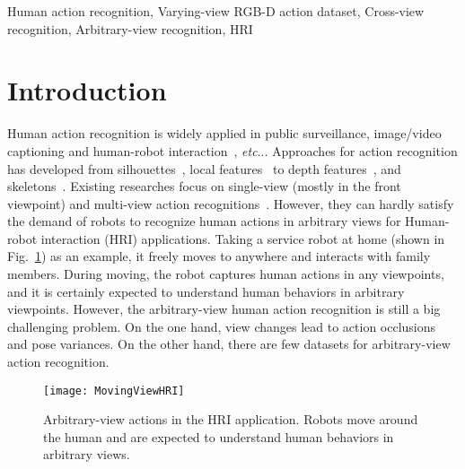 \documentclass[journal]{IEEEtran}
\makeatletter
\DeclareRobustCommand\onedot{\futurelet\@let@token\@onedot}
\def\@onedot{\ifx\@let@token.\else.\null\fi\xspace}
\def\etc{\emph{etc}\onedot} \def\vs{\emph{vs}\onedot}
\makeatother
\begin{document}
\begin{IEEEkeywords}
Human action recognition, Varying-view RGB-D action dataset, Cross-view recognition, Arbitrary-view recognition, HRI
\end{IEEEkeywords}


\IEEEpeerreviewmaketitle

\section{Introduction}

Human action recognition is widely applied in public surveillance, image/video captioning and human-robot interaction~\cite{TIP2017Event,CVPRJirongrong,yi2018describing}, \etc. Approaches for action recognition has developed from silhouettes~\cite{ZhuLSRF2013,GaoCollab2017}, local features~\cite{TIP2016Semantic,TIP2014image,wu2018sequence} to depth features~\cite{ZhengSoft2016,CookingActivity2012}, and skeletons~\cite{LiWWHL2017,Ji2017One}. Existing researches focus on single-view (mostly in the front viewpoint) and multi-view action recognitions~\cite{hash2017}. However, they can hardly satisfy the demand of robots to recognize human actions in arbitrary views for Human-robot interaction (HRI) applications. Taking a service robot at home (shown in Fig.~\ref{fig:MovingViewHRI}) as an example, it freely moves to anywhere and interacts with family members. During moving, the robot captures human actions in any viewpoints, and it is certainly expected to understand human behaviors in arbitrary viewpoints. However, the arbitrary-view human action recognition is still a big challenging problem. On the one hand, view changes lead to action occlusions and pose variances. On the other hand, there are few datasets for arbitrary-view action recognition.
\begin{figure}
\begin{center}
\texttt{[image: MovingViewHRI]}
\end{center}
   \caption{Arbitrary-view actions in the HRI application. Robots move around the human and are expected to understand human behaviors in arbitrary views. }
\label{fig:MovingViewHRI}
\end{figure}
\end{document}
